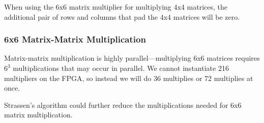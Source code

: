 When using the 6x6 matrix multiplier for multiplying 4x4 matrices, the additional pair of rows and columns that pad the 4x4 matrices will be zero.

\subsubsection{6x6 Matrix-Matrix Multiplication}
Matrix-matrix multiplication is highly parallel---multiplying 6x6 matrices requires $6^3$ multiplications that may occur in parallel. We cannot instantiate 216 multipliers on the FPGA, so instead we will do 36 multiplies or 72 multiplies at once.

Strassen's algorithm could further reduce the multiplications needed for 6x6 matrix multiplication.
